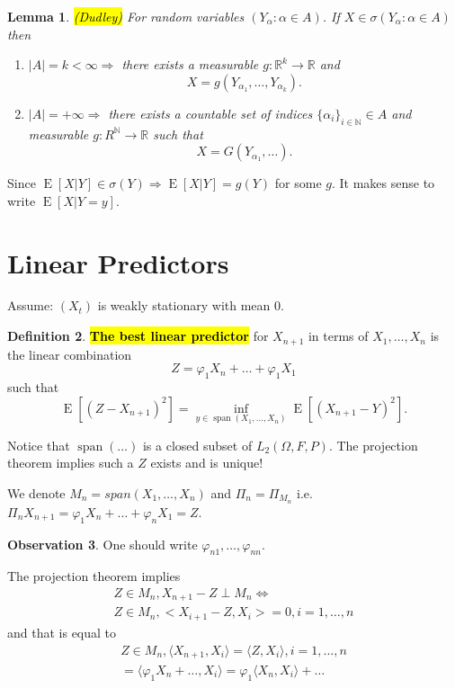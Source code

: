 \documentclass[12pt,a4paper, notitlepage]{book}
\newcommand{\hlc}[2][yellow]{ {\sethlcolor{#1} \hl{#2}} }
\newcommand{\hlcr}[1]{\hlc[lightred]{#1}}
\theoremstyle{definition} %
\newtheorem{definition}{Definition}[section]
\newtheorem{observation}[definition]{Observation}
\theoremstyle{plain} %
\newtheorem{lemma}[definition]{Lemma}
\newcommand{\R}{\mathbb R}
\newcommand{\N}{\mathbb N}
\DeclareMathOperator{\E}{E}
\DeclareMathOperator{\Span}{span}
\newcommand{\New}[1]{ {\bf \hlcr{#1} } }
\newcommand{\Important}[1]{ {\it \hlc{#1} } }
\begin{document}
\begin{lemma} \Important{(Dudley)}
For random variables $(Y_\alpha: \alpha \in A)$. If $X \in \sigma(Y_\alpha: \alpha \in A)$ then
\begin{enumerate}
\item $|A| = k < \infty \Rightarrow$ there exists a measurable $g: \R^k \rightarrow \R$ and 
\[X = g(Y_{\alpha_1}, \dots, Y_{\alpha_k}) . \]
\item $|A| = +\infty \Rightarrow$ there exists a countable set of indices $\{\alpha_i\}_{i \in \N} \in A$ and measurable
$g: R^\N \rightarrow \R$ such that 
\[ X = G(Y_{\alpha_1}, \dots) . \]
\end{enumerate}
\end{lemma}

Since $\E[X|Y] \in \sigma(Y) \Rightarrow \E[X|Y] = g(Y)$ for some $g$. It makes sense to write $\E[X | Y = y]$. 

\section{Linear Predictors}

Assume: $(X_t)$ is weakly stationary with mean $0$. 

\begin{definition}
\New{ The best  linear predictor} for $X_{n+1}$ in terms of $X_1, \dots, X_n$ is the linear combination 
\[ Z = \varphi_1 X_n + \dots + \varphi_1 X_1 \]
such that 
\[ \E\left[ (Z - X_{n+1})^2\right] = \inf_{y \in 
\Span(X_1, \dots, X_n)} \E\left[(X_{n+1} -Y)^2 \right]  . \]
\end{definition}

Notice that $ \Span(\dots)$ is a closed subset of $L_2(\Omega, F, P)$. The projection theorem implies such a $Z$ exists and is unique! 

We denote $M_n = span(X_1, \dots, X_n)$ and $\Pi_n = \Pi_{M_n}$ i.e. $\Pi_nX_{n+1} = \varphi_1 X_n + \dots + \varphi_n X_1 = Z$. 

\begin{observation}
One should write $\varphi_{n 1}, \dots, \varphi_{n n}$.
\end{observation}

The projection theorem implies 
\begin{align*} Z \in M_n, X_{n+1} - Z \perp M_n \iff \\
 Z \in M_n, <X_{i+1} - Z, X_i> = 0, i = 1, \dots, n \end{align*}
 and that is equal to
\begin{align*}
Z \in M_n, \langle X_{n+1}, X_i \rangle = \langle Z, X_i \rangle,  i = 1, \dots, n \\
 = \langle \varphi_1 X_n+ \dots, X_i \rangle = \varphi_1 \langle X_n, X_i \rangle + \dots 
\end{align*}
\end{document}
